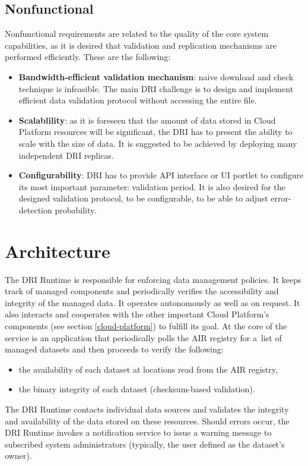 \subsection{Nonfunctional}
Nonfunctional requirements are related to the quality of the core system
capabilities, as it is desired that validation and replication mechanisms are
performed efficiently. These are the following:
\begin{itemize}
	\item \textbf{Bandwidth-efficient validation mechanism}: naive download and
	check technique is infeasible. The main DRI challenge is to design and
	implement efficient data validation protocol without accessing the entire
	file.
	\item \textbf{Scalablility}: as it is foreseen that the amount of data
	stored in Cloud Platform resources will be significant, the DRI has to
	present the ability to scale with the size of data. It is suggested to be
	achieved by deploying many independent DRI replicas. 
	\item \textbf{Configurability}: DRI has to provide API interface or UI
	portlet to configure its most important parameter: validation period. It is
	also desired for the designed validation protocol, to be configurable, to
	be able to adjust error-detection probability.
\end{itemize}

\section{Architecture}
The DRI Runtime is responsible for enforcing data management policies. It keeps
track of managed components and periodically verifies the accessibility and
integrity of the managed data. It operates autonomously as well as on request.
It also interacts and cooperates with the other important Cloud Platform's
components (see section \ref{cloud-platform}) to fulfill its goal. At the core
of the service is an application that periodically polls the AIR registry for
a~list of managed datasets and then proceeds to verify the following:

\begin{itemize}
	\item the availability of each dataset at locations read from the AIR
	registry,
	\item the binary integrity of each dataset (checksum-based validation).
\end{itemize}

The DRI Runtime contacts individual data sources and validates the integrity
and availability of the data stored on these resources. Should errors occur,
the DRI Runtime invokes a notification service to issue a warning message
to subscribed system administrators (typically, the user defined as the 
dataset's owner).\\

